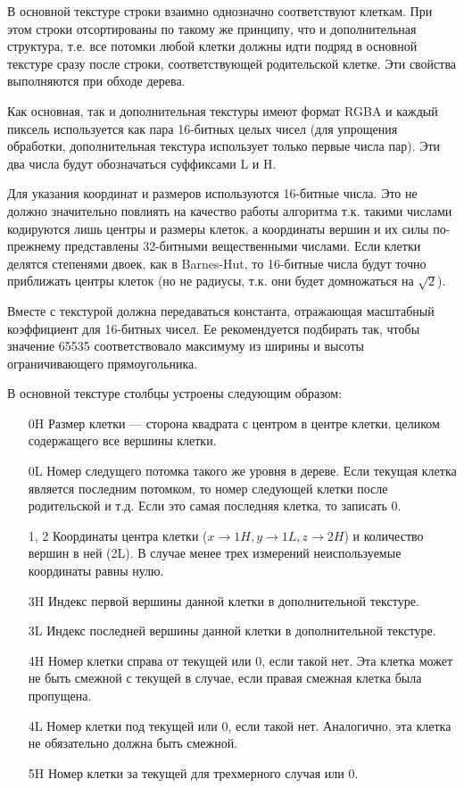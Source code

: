 В основной текстуре строки взаимно однозначно соответствуют клеткам. При этом строки отсортированы по такому же принципу, что и дополнительная структура, т.е. все потомки любой клетки должны идти подряд в основной текстуре сразу после строки, соответствующей родительской клетке. Эти свойства выполняются при обходе дерева.

Как основная, так и дополнительная текстуры имеют формат RGBA и каждый пиксель используется как пара 16-битных целых чисел (для упрощения обработки, дополнительная текстура использует только первые числа пар). Эти два числа будут обозначаться суффиксами L и H.

Для указания координат и размеров используются 16-битные числа. Это не должно значительно повлиять на качество работы алгоритма т.к. такими числами кодируются лишь центры и размеры клеток, а координаты вершин и их силы по-прежнему представлены 32-битными вещественными числами. Если клетки делятся степенями двоек, как в Barnes-Hut, то 16-битные числа будут точно приближать центры клеток (но не радиусы, т.к. они будет домножаться на $\sqrt{2}$).

Вместе с текстурой должна передаваться константа, отражающая масштабный коэффициент для 16-битных чисел. Ее рекомендуется подбирать так, чтобы значение 65535 соответствовало максимуму из ширины и высоты ограничивающего прямоугольника.

В основной текстуре столбцы устроены следующим образом:

\begin{itemize}
\item[0H] Размер клетки --- сторона квадрата с центром в центре клетки, целиком содержащего все вершины клетки.
\item[0L] Номер следущего потомка такого же уровня в дереве. Если текущая клетка является последним потомком, то номер следующей клетки после родительской и т.д. Если это самая последняя клетка, то записать 0.
\item[1, 2] Координаты центра клетки ($x\to 1H, y\to 1L, z\to 2H$) и количество вершин в ней (2L). В случае менее трех измерений неиспользуемые координаты равны нулю.
\item[3H] Индекс первой вершины данной клетки в дополнительной текстуре.
\item[3L] Индекс последней вершины данной клетки в дополнительной текстуре.
\item[4H] Номер клетки справа от текущей или 0, если такой нет. Эта клетка может не быть смежной с текущей в случае, если правая смежная клетка была пропущена.
\item[4L] Номер клетки под текущей или 0, если такой нет. Аналогично, эта клетка не обязательно должна быть смежной.
\item[5H] Номер клетки за текущей для трехмерного случая или 0.
\end{itemize}

